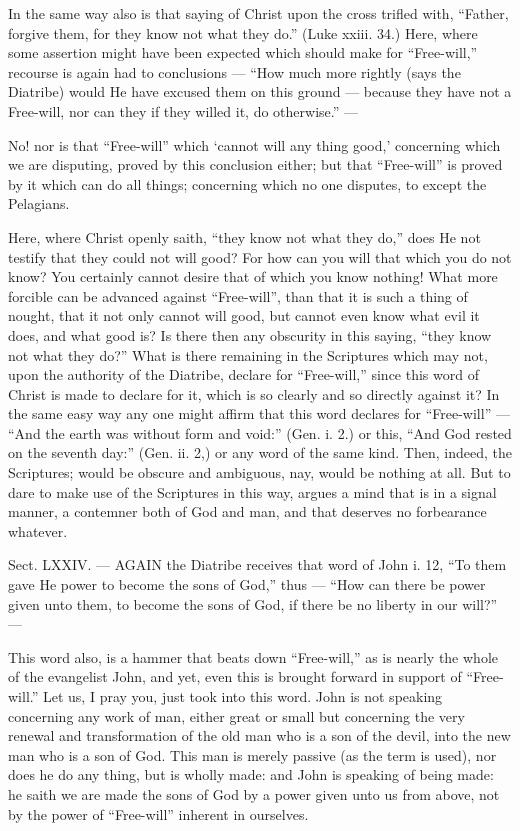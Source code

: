 In the same way also is that saying of Christ upon the cross trifled with, “Father, forgive them, for they know not what they do.” (Luke xxiii. 34.) Here, where some assertion might have been expected which should make for “Free-will,” recourse is again had to conclusions — “How much more rightly (says the Diatribe) would He have excused them on this ground — because they have not a Free-will, nor can they if they willed it, do otherwise.” —

No! nor is that “Free-will” which ‘cannot will any thing good,’ concerning which we are disputing, proved by this conclusion either; but that “Free-will” is proved by it which can do all things; concerning which no one disputes, to except the Pelagians.

Here, where Christ openly saith, “they know not what they do,” does He not testify that they could not will good? For how can you will that which you do not know? You certainly cannot desire that of which you know nothing! What more forcible can be advanced against “Free-will”, than that it is such a thing of nought, that it not only cannot will good, but cannot even know what evil it does, and what good is? Is there then any obscurity in this saying, “they know not what they do?” What is there remaining in the Scriptures which may not, upon the authority of the Diatribe, declare for “Free-will,” since this word of Christ is made to declare for it, which is so clearly and so directly against it? In the same easy way any one might affirm that this word declares for “Free-will” — “And the earth was without form and void:” (Gen. i. 2.) or this, “And God rested on the seventh day:” (Gen. ii. 2,) or any word of the same kind. Then, indeed, the Scriptures; would be obscure and ambiguous, nay, would be nothing at all. But to dare to make use of the Scriptures in this way, argues a mind that is in a signal manner, a contemner both of God and man, and that deserves no forbearance whatever.


Sect. LXXIV. — AGAIN the Diatribe receives that word of John i. 12, “To them gave He power to become the sons of God,” thus — “How can there be power given unto them, to become the sons of God, if there be no liberty in our will?” —

This word also, is a hammer that beats down “Free-will,” as is nearly the whole of the evangelist John, and yet, even this is brought forward in support of “Free-will.” Let us, I pray you, just took into this word. John is not speaking concerning any work of man, either great or small but concerning the very renewal and transformation of the old man who is a son of the devil, into the new man who is a son of God. This man is merely passive (as the term is used), nor does he do any thing, but is wholly made: and John is speaking of being made: he saith we are made the sons of God by a power given unto us from above, not by the power of “Free-will” inherent in ourselves.

